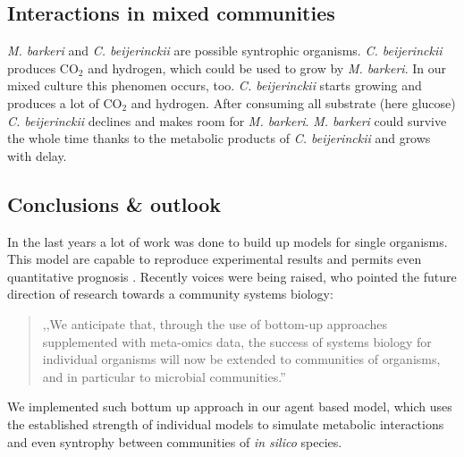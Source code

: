 \subsection{Interactions in mixed communities}
\textit{M. barkeri} and \textit{C. beijerinckii} are possible syntrophic organisms.
\textit{C. beijerinckii} produces CO$_2$ and hydrogen, which could be used to grow by \textit{M. barkeri}.
In our mixed culture this phenomen occurs, too.
\textit{C. beijerinckii} starts growing and produces a lot of CO$_2$ and hydrogen.
After consuming all substrate (here glucose) \textit{C. beijerinckii} declines and makes room for \textit{M. barkeri}.
\textit{M. barkeri} could survive the whole time thanks to the metabolic products of \textit{C. beijerinckii} and grows with delay.


\subsection{Conclusions \& outlook}
In the last years a lot of work was done to build up models for single organisms.
This model are capable to reproduce experimental results and permits even quantitative prognosis \cite{mccloskey}.
Recently voices were being raised, who pointed the future direction of research towards a community systems biology:
\begin{quote}
,,We anticipate that, through the use of bottom-up approaches supplemented with meta-omics data, the success of systems biology for individual organisms will now be extended to communities of organisms, and in particular to microbial communities.'' \cite{cosys}
\end{quote}
We implemented such bottum up approach in our agent based model, which uses the established strength of individual models to simulate metabolic interactions and even syntrophy between communities of \textit{in silico} species.

